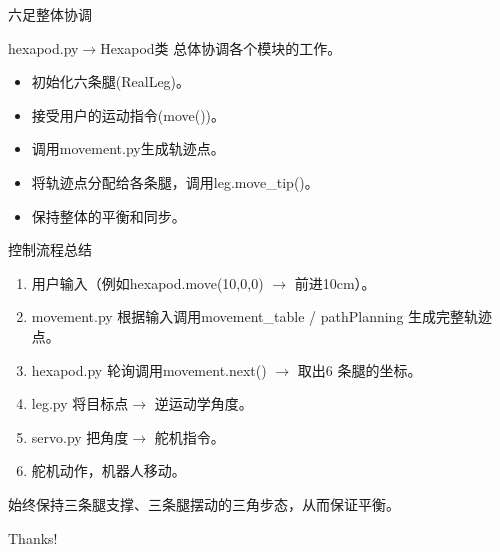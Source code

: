 \documentclass{beamer}
\begin{document}
\begin{frame}{六足整体协调}
    \begin{exampleblock}{hexapod.py$\rightarrow $Hexapod类}
        总体协调各个模块的工作。
        \begin{itemize}
            \item 初始化六条腿(RealLeg)。
            \item 接受用户的运动指令(move())。
            \item 调用movement.py生成轨迹点。
            \item 将轨迹点分配给各条腿，调用leg.move\_tip()。
            \item 保持整体的平衡和同步。
        \end{itemize}
        
    \end{exampleblock}
\end{frame}

\begin{frame}{控制流程总结}
    \begin{enumerate}
        \item 用户输入（例如hexapod.move(10,0,0) $\rightarrow$ 前进10cm）。
        \item movement.py 根据输入调用movement\_table / pathPlanning 生成完整轨迹点。
        \item hexapod.py 轮询调用movement.next() $\rightarrow$ 取出6 条腿的坐标。
        \item leg.py 将目标点$\rightarrow$ 逆运动学角度。
        \item servo.py 把角度$\rightarrow$ 舵机指令。
        \item 舵机动作，机器人移动。
    \end{enumerate}
    始终保持三条腿支撑、三条腿摆动的三角步态，从而保证平衡。
\end{frame}

\begin{frame}
    \begin{center}
        {\Huge\calligra Thanks!}
    \end{center}
\end{frame}
\end{document}
